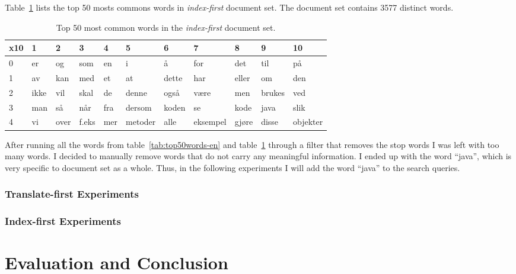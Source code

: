 \documentclass[a4paper]{book}
\begin{document}
Table~\ref{tab:top50words-no} lists the top 50 mosts commons words in \textit{index-first} document set. The document set contains 3577 distinct words.
\begin{table}[H]
\centering
\begin{tabular}{|l|l l l l l l l l l l|}
\hline\hline
    x10 & 1 & 2 & 3 & 4 & 5 & 6 & 7 & 8 & 9 & 10 \\
\hline
    0 & er & og & som & en & i & å & for & det & til & på \\
\hline
    1 & av & kan & med & et & at & dette & har & eller & om & den \\
\hline
    2 & ikke & vil & skal & de & denne & også & være & men & brukes & ved \\
\hline
    3 & man & så & når & fra & dersom & koden & se & kode & java & slik \\
\hline
    4 & vi & over & f.eks & mer & metoder & alle & eksempel & gjøre & disse & objekter \\
\hline\hline
\end{tabular}
\caption{Top 50 most common words in the \textit{index-first} document set.}
\label{tab:top50words-no}
\end{table}

After running all the words from table~\ref{tab:top50words-en} and table~\ref{tab:top50words-no} through a filter that removes the stop words I was left with too many words. I decided to manually remove words that do not carry any meaningful information. I ended up with the word ``java'', which is very specific to document set as a whole. Thus, in the following experiments I will add the word ``java'' to the search queries.

\subsection{Translate-first Experiments}
\label{subsec:experiments-en2}



\subsection{Index-first Experiments}
\label{subsec:experiments-no2}



\chapter{Evaluation and Conclusion}
\label{cha:evaluationAndConclusion}
\end{document}
